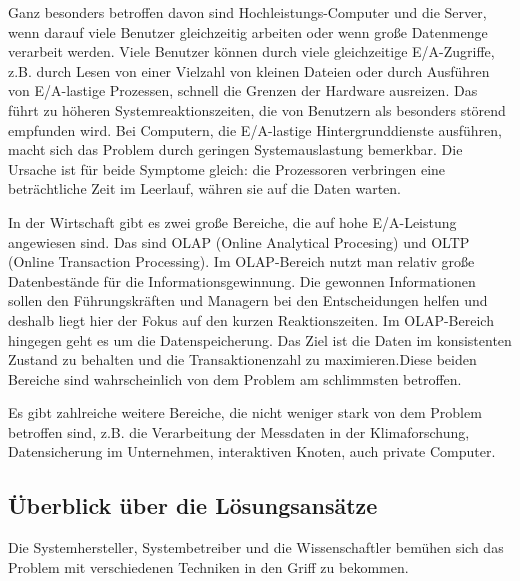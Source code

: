 Ganz besonders betroffen davon sind Hochleistungs-Computer und die Server, wenn darauf viele Benutzer gleichzeitig arbeiten oder wenn große Datenmenge verarbeit werden. Viele Benutzer können durch viele gleichzeitige E/A-Zugriffe, z.B. durch Lesen von einer Vielzahl von kleinen Dateien oder durch Ausführen von E/A-lastige Prozessen, schnell die Grenzen der Hardware ausreizen. Das führt zu höheren Systemreaktionszeiten, die von Benutzern als besonders störend empfunden wird. Bei Computern, die E/A-lastige Hintergrunddienste ausführen, macht sich das Problem durch geringen Systemauslastung bemerkbar. Die Ursache ist für beide Symptome gleich: die Prozessoren verbringen eine beträchtliche Zeit im Leerlauf, währen sie auf die Daten warten. 

In der Wirtschaft gibt es zwei große Bereiche, die auf hohe E/A-Leistung angewiesen sind. Das sind OLAP (Online Analytical Procesing) und OLTP (Online Transaction Processing). Im OLAP-Bereich nutzt man relativ große Datenbestände für die Informationsgewinnung. Die gewonnen Informationen sollen den Führungskräften und Managern bei den Entscheidungen helfen und deshalb liegt hier der Fokus auf den kurzen Reaktionszeiten. Im OLAP-Bereich hingegen geht es um die Datenspeicherung. Das Ziel ist die Daten im konsistenten Zustand zu behalten und die Transaktionenzahl zu maximieren.Diese beiden Bereiche sind wahrscheinlich von dem Problem am schlimmsten betroffen.

Es gibt zahlreiche weitere Bereiche, die nicht weniger stark von dem Problem betroffen sind, z.B. die Verarbeitung der Messdaten in der Klimaforschung, Datensicherung im Unternehmen, interaktiven Knoten, auch private Computer.

\subsection{Überblick über die Lösungsansätze}
Die Systemhersteller, Systembetreiber und die Wissenschaftler bemühen sich das Problem mit verschiedenen Techniken in den Griff zu bekommen. 

